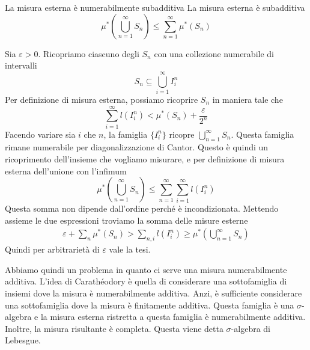 \documentclass[a4paper]{article}
\begin{document}
\begin{radioactive}
\begin{snippetproposition}{La misura esterna è numerabilmente subadditiva}
    La misura esterna è subadditiva \[
        \mu^*\left(
            \bigcup_{n=1}^\infty S_n
        \right) \leq \sum_{n=1}^\infty \mu^*(S_n)
    \]
\end{snippetproposition}
\end{radioactive}

\begin{radioactive}
\begin{snippetproof}{}
    Sia \(\varepsilon > 0\).
    Ricopriamo ciascuno degli \(S_n\) con una collezione numerabile di intervalli
    \[
        S_n \subseteq \bigcup_{i=1}^\infty I_i^n
    \]
    Per definizione di misura esterna, possiamo
    ricoprire \(S_n\) in maniera tale che
    \[
        \sum_{i=1}^\infty l(I_i^n)<\mu^*(S_n)+\frac{\varepsilon}{2^n}
    \]
    Facendo variare sia \(i\) che \(n\), la famiglia \(\{I_i^n\}\)
    ricopre \(\bigcup_{n=1}^\infty S_n\).
    Questa famiglia rimane numerabile per diagonalizzazione di Cantor.
    Questo è quindi un ricoprimento dell'insieme che vogliamo misurare, e per definizione
    di misura esterna dell'unione con l'infimum
    \[
        \mu^*\left(
            \bigcup_{n=1}^\infty S_n
        \right) \leq \sum_{n=1}^\infty\sum_{i=1}^\infty l(I_i^n)
    \]
    Questa somma non dipende dall'ordine perché è incondizionata.
    Mettendo assieme le due espressioni troviamo la somma delle misure esterne
    \begin{align*}
        \varepsilon+\sum_n\mu^*(S_n)>\sum_{n,i}l(I_i^n)
        \geq \mu^* \left(
            \bigcup_{n=1}^\infty S_n
        \right)
    \end{align*}
    Quindi per arbitrarietà di \(\varepsilon\) vale la tesi.
\end{snippetproof}
\end{radioactive}

\begin{radioactive}
Abbiamo quindi un problema in quanto ci serve una misura numerabilmente additiva.
L'idea di Carathéodory è quella di considerare una sottofamiglia
di insiemi dove la misura è numerabilmente additiva.
Anzi, è sufficiente considerare una sottofamiglia dove la misura è finitamente additiva.
Questa famiglia è una \(\sigma\)-algebra e la misura
esterna ristretta a questa famiglia è numerabilmente additiva.
Inoltre, la misura risultante è completa. Questa viene detta \(\sigma\)-algebra di Lebesgue.
\end{radioactive}
\end{document}
